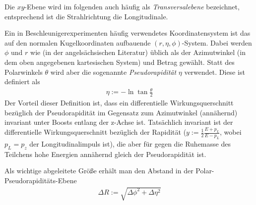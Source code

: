 Die $xy$-Ebene wird im folgenden auch häufig als \emph{Transversalebene}
bezeichnet, entsprechend ist die Strahlrichtung die Longitudinale.

Ein in Beschleunigerexperimenten häufig verwendetes Koordinatensystem ist das
auf den normalen Kugelkoordinaten aufbauende $(r, \eta, \phi)$-System.  Dabei
werden $\phi$ und $r$ wie (in der angelsächsischen Literatur) üblich als der
Azimutwinkel (in dem oben angegebenen kartesischen System) und Betrag gewählt.
Statt des Polarwinkels $\theta$ wird aber die sogenannte \emph{Pseudorapidität}
$\eta$ verwendet. Diese ist definiert als
\begin{align}
  \eta := -\ln{\tan{\frac \theta 2}}
\end{align}
Der Vorteil dieser Definition ist, dass ein differentielle Wirkungsquerschnitt
bezüglich der Pseudorapidität im Gegensatz zum Azimutwinkel (annähernd)
invariant unter Boosts entlang der z-Achse ist.  Tatsächlich invariant ist der
differentielle Wirkungsquerschnitt bezüglich der Rapidität ($y := \frac12
\frac{E + p_L}{E - p_L}$, wobei $p_L = p_z$ der Longitudinalimpuls ist), die
aber für gegen die Ruhemasse des Teilchens hohe Energien annähernd gleich der
Pseudorapidität ist.

Als wichtige abgeleitete Größe erhält man den Abstand in der
Polar-Pseudorapiditäts-Ebene
\begin{align}
  \Delta R := \sqrt{\Delta\phi^2 + \Delta\eta^2}
  \label{def:dr}
\end{align}
